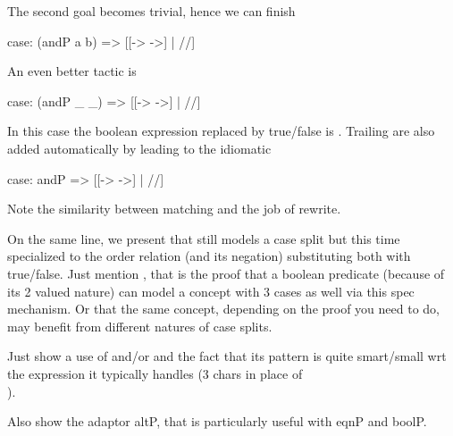 The second goal becomes trivial, hence we can finish

\begin{coq}{}{}
case: (andP a b) => [[-> ->] | //]
\end{coq}

An even better tactic is

\begin{coq}{}{}
case: (andP _ _) => [[-> ->] | //]
\end{coq}

In this case the boolean expression replaced by true/false is \C{(_ && _)}.
Trailing \C{_} are also added automatically by  leading to the
idiomatic

\begin{coq}{}{}
case: andP => [[-> ->] | //]
\end{coq}

Note the similarity between matching \C{(_ && _)} and the job of rewrite.

On the same line, we present  that still models a case split but
this time specialized to the order relation (and its negation) substituting
both with true/false.  Just mention , that is the proof that
a boolean predicate (because of its 2 valued nature) can model a concept
with 3 cases as well via this spec mechanism.  Or that the same concept,
depending on the proof you need to do, may benefit from different natures
of case splits.


Just show a use of  and/or  and the fact that its pattern is
quite smart/small wrt the expression it typically handles (3 chars in place of\\
).

Also show the adaptor altP, that is particularly useful with eqnP and boolP.



